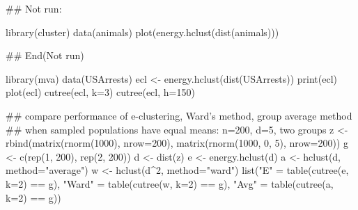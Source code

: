 \begin{Examples}
\begin{ExampleCode}
   ## Not run: 
   
   library(cluster)
   data(animals)
   plot(energy.hclust(dist(animals)))
   
## End(Not run)
   
   library(mva)
   data(USArrests)
   ecl <- energy.hclust(dist(USArrests))
   print(ecl)    
   plot(ecl)
   cutree(ecl, k=3)
   cutree(ecl, h=150)
   
   ## compare performance of e-clustering, Ward's method, group average method
   ## when sampled populations have equal means: n=200, d=5, two groups
   z <- rbind(matrix(rnorm(1000), nrow=200), matrix(rnorm(1000, 0, 5), nrow=200))
   g <- c(rep(1, 200), rep(2, 200))
   d <- dist(z)
   e <- energy.hclust(d)
   a <- hclust(d, method="average")
   w <- hclust(d^2, method="ward")
   list("E" = table(cutree(e, k=2) == g), "Ward" = table(cutree(w, k=2) == g),
        "Avg" = table(cutree(a, k=2) == g))
 \end{ExampleCode}
\end{Examples}

